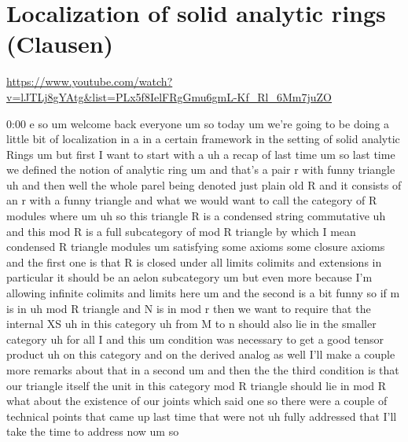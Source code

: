 
\section{\ufs Localization of solid analytic rings (Clausen)}

\url{https://www.youtube.com/watch?v=lJTLj8gYAtg&list=PLx5f8IelFRgGmu6gmL-Kf_Rl_6Mm7juZO}
\renewcommand{\yt}[2]{\href{https://www.youtube.com/watch?v=lJTLj8gYAtg&list=PLx5f8IelFRgGmu6gmL-Kf_Rl_6Mm7juZO&t=#1}{#2}}
\vspace{1em}

\begin{unfinished}{0:00}
e
so  um  welcome  back  everyone  um  so  today
um  we're  going  to  be  doing  a  little  bit
of  localization  in  a  in  a  certain
framework  in  the  setting  of  solid
analytic
Rings  um  but  first  I  want  to  start  with
a  uh  a  recap  of  last
time  um  so  last  time  we  defined  the
notion
of  analytic
ring  um  and  that's  a
pair  r  with  funny  triangle  uh  and  then
well  the  whole  parel  being  denoted  just
plain  old  R  and  it  consists  of  an  r  with
a  funny  triangle  and  what  we  would  want
to  call  the  category  of  R  modules
where  um
uh  so  this  triangle  R  is  a  condensed
string
commutative  uh  and  this  mod
R  is  a  full
subcategory  of  mod  R  triangle  by  which  I
mean  condensed  R  triangle
modules  um  satisfying  some  axioms  some
closure  axioms  and  the  first  one  is  that
R  is  closed
under  all  limits
colimits  and
extensions  in  particular  it  should  be  an
aelon
subcategory  um  but  even  more  because  I'm
allowing  infinite  colimits  and  limits
here  um  and  the  second  is  a  bit  funny  so
if  m  is  in  uh  mod  R  triangle  and  N  is  in
mod
r  then  we  want  to  require  that  the
internal
XS  uh  in  this  category  uh  from  M  to  n
should  also  lie  in  the  smaller
category  uh  for  all
I  and  this  um  condition  was  necessary  to
get  a
good  tensor  product  uh  on  this  category
and  on  the  derived  analog  as  well  I'll
make  a  couple  more  remarks  about  that  in
a  second  um  and  then  the  the  third
condition  is  that  our  triangle  itself
the  unit  in  this  category  mod  R  triangle
should  lie  in  mod
R  what  about  the  existence  of  our  joints
which  said  one  so  there  were  a  couple  of
technical  points  that  came  up  last  time
that  were  not  uh  fully  addressed  that
I'll  take  the  time  to  address  now  um  so

\end{unfinished}

